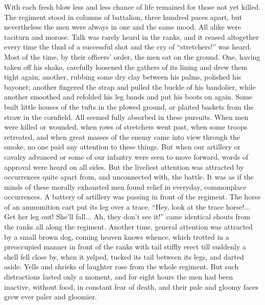With each fresh blow less and less chance of life remained for
those not yet killed. The regiment stood in columns of battalion,
three hundred paces apart, but nevertheless the men were always
in one and the same mood. All alike were taciturn and
morose. Talk was rarely heard in the ranks, and it ceased
altogether every time the thud of a successful shot and the cry
of ``stretchers!'' was heard. Most of the time, by their
officers' order, the men sat on the ground. One, having taken off
his shako, carefully loosened the gathers of its lining and drew
them tight again; another, rubbing some dry clay between his
palms, polished his bayonet; another fingered the strap and
pulled the buckle of his bandolier, while another smoothed and
refolded his leg bands and put his boots on again. Some built
little houses of the tufts in the plowed ground, or plaited
baskets from the straw in the cornfield. All seemed fully
absorbed in these pursuits. When men were killed or wounded, when
rows of stretchers went past, when some troops retreated, and
when great masses of the enemy came into view through the smoke,
no one paid any attention to these things. But when our artillery
or cavalry advanced or some of our infantry were seen to move
forward, words of approval were heard on all sides. But the
liveliest attention was attracted by occurrences quite apart
from, and unconnected with, the battle. It was as if the minds of
these morally exhausted men found relief in everyday, commonplace
occurrences. A battery of artillery was passing in front of the
regiment. The horse of an ammunition cart put its leg over a
trace.  ``Hey, look at the trace horse!... Get her leg out!
She'll fall... Ah, they don't see it!'' came identical shouts
from the ranks all along the regiment. Another time, general
attention was attracted by a small brown dog, coming heaven knows
whence, which trotted in a preoccupied manner in front of the
ranks with tail stiffly erect till suddenly a shell fell close
by, when it yelped, tucked its tail between its legs, and darted
aside. Yells and shrieks of laughter rose from the whole
regiment. But such distractions lasted only a moment, and for
eight hours the men had been inactive, without food, in constant
fear of death, and their pale and gloomy faces grew ever paler
and gloomier.

